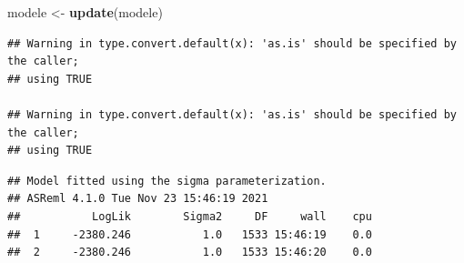 \documentclass[
  12pt,
]{book}
\newenvironment{Shaded}{\begin{snugshade}}{\end{snugshade}}
\newcommand{\KeywordTok}[1]{\textcolor[rgb]{0.13,0.29,0.53}{\textbf{#1}}}
\newcommand{\NormalTok}[1]{#1}
\newcommand{\OperatorTok}[1]{\textcolor[rgb]{0.81,0.36,0.00}{\textbf{#1}}}
\newcommand{\StringTok}[1]{\textcolor[rgb]{0.31,0.60,0.02}{#1}}
\begin{document}
\begin{Shaded}
\begin{Highlighting}[]
\NormalTok{modele \textless{}{-}}\StringTok{ }\KeywordTok{update}\NormalTok{(modele)}
\end{Highlighting}
\end{Shaded}

\begin{verbatim}
## Warning in type.convert.default(x): 'as.is' should be specified by the caller;
## using TRUE

## Warning in type.convert.default(x): 'as.is' should be specified by the caller;
## using TRUE
\end{verbatim}

\begin{verbatim}
## Model fitted using the sigma parameterization.
## ASReml 4.1.0 Tue Nov 23 15:46:19 2021
##           LogLik        Sigma2     DF     wall    cpu
##  1     -2380.246           1.0   1533 15:46:19    0.0
##  2     -2380.246           1.0   1533 15:46:20    0.0
\end{verbatim}

\begin{Shaded}
\end{Shaded}
\end{document}
